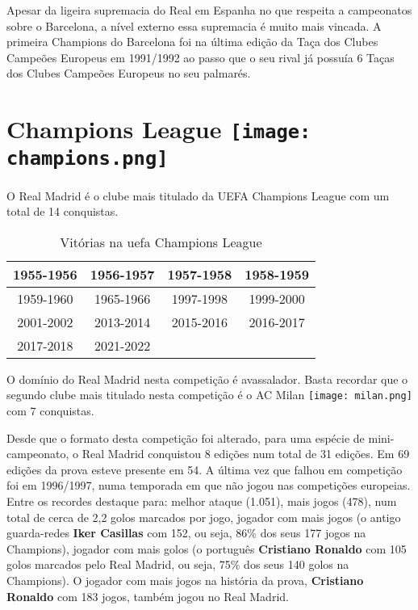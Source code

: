 \documentclass{report}
\begin{document}
Apesar da ligeira supremacia do Real em Espanha no que respeita a campeonatos sobre o Barcelona, a nível externo essa supremacia é muito mais vincada. A primeira Champions do Barcelona foi na última edição da Taça dos Clubes Campeões Europeus em 1991/1992 ao passo que o seu rival já possuía 6 Taças dos Clubes Campeões Europeus no seu palmarés. 



\chapter{Champions League \protect\texttt{[image: champions.png]}}
\label{chap.champions}
O Real Madrid é o clube mais titulado da \acs{UEFA} Champions League com um total de 14 conquistas.\cite{champions}
\begin{table}[h]
    \centering
    \begin{tabular}{|c|c|c|c|}
    \hline
    1955-1956 & 1956-1957 & 1957-1958 & 1958-1959 \\ \hline
    1959-1960 & 1965-1966 & 1997-1998 & 1999-2000 \\ \hline
    2001-2002 & 2013-2014 & 2015-2016 & 2016-2017 \\ \hline
    2017-2018 & 2021-2022 &           &           \\ \hline
    \end{tabular}
    \caption{Vitórias na \acs{uefa} Champions League}
    \label{tab:vitorias_uefa}
\end{table}
O domínio do Real Madrid nesta competição é avassalador. Basta recordar que o segundo clube mais titulado nesta competição é o AC Milan \texttt{[image: milan.png]} com 7 conquistas. 

Desde que o formato desta competição foi alterado, para uma espécie de mini-campeonato, o Real Madrid conquistou 8 edições num total de 31 edições. Em 69 edições da prova esteve presente em 54. A última vez que falhou em competição foi em 1996/1997, numa temporada em que não jogou nas competições europeias.
\\

Entre os recordes destaque para: melhor ataque (1.051), mais jogos (478), num total de cerca de 2,2 golos marcados por jogo, jogador com mais jogos (o antigo guarda-redes \textbf{Iker Casillas} com 152, ou seja, 86\% dos seus 177 jogos na Champions), jogador com mais golos (o português \textbf{Cristiano Ronaldo} com 105 golos marcados pelo Real Madrid, ou seja, 75\% dos seus 140 golos na Champions). O jogador com mais jogos na história da prova, \textbf{Cristiano Ronaldo} com 183 jogos, também jogou no Real Madrid. 
\\
\end{document}
